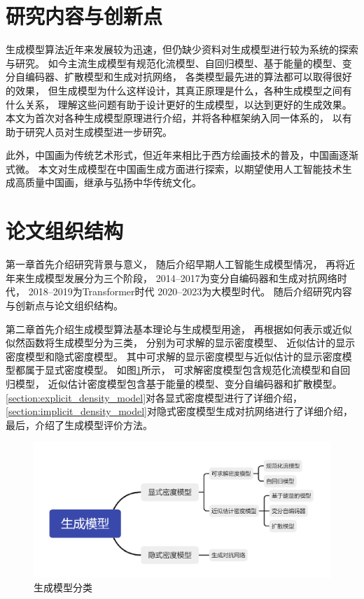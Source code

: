 \section{研究内容与创新点}
生成模型算法近年来发展较为迅速，但仍缺少资料对生成模型进行较为系统的探索与研究。
如今主流生成模型有规范化流模型、自回归模型、基于能量的模型、变分自编码器、扩散模型和生成对抗网络，
各类模型最先进的算法都可以取得很好的效果，
但生成模型为什么这样设计，其真正原理是什么，各种生成模型之间有什么关系，
理解这些问题有助于设计更好的生成模型，以达到更好的生成效果。
本文为首次对各种生成模型原理进行介绍，并将各种框架纳入同一体系的，
以有助于研究人员对生成模型进一步研究。

此外，中国画为传统艺术形式，但近年来相比于西方绘画技术的普及，中国画逐渐式微。
本文对生成模型在中国画生成方面进行探索，以期望使用人工智能技术生成高质量中国画，继承与弘扬中华传统文化。





\section{论文组织结构}

第一章首先介绍研究背景与意义，
随后介绍早期人工智能生成模型情况，
再将近年来生成模型发展分为三个阶段，
2014–2017为变分自编码器和生成对抗网络时代，
2018–2019为Transformer时代
2020–2023为大模型时代。
随后介绍研究内容与创新点与论文组织结构。

第二章首先介绍生成模型算法基本理论与生成模型用途，
再根据如何表示或近似似然函数将生成模型分为三类，
分别为可求解的显示密度模型、
近似估计的显示密度模型和隐式密度模型。
其中可求解的显示密度模型与近似估计的显示密度模型都属于显式密度模型。
如图{\ref{fig:gennerative_models}}所示，
可求解密度模型包含规范化流模型和自回归模型，
近似估计密度模型包含基于能量的模型、变分自编码器和扩散模型。
{\ref{section:explicit_density_model}}对各显式密度模型进行了详细介绍，
{\ref{section:implicit_density_model}}对隐式密度模型生成对抗网络进行了详细介绍，
最后，介绍了生成模型评价方法。
\begin{figure}[ht]
    \centering
    \includegraphics[width=\textwidth]{figures/gennerative_models}
    \caption{生成模型分类}\label{fig:gennerative_models}
\end{figure}



